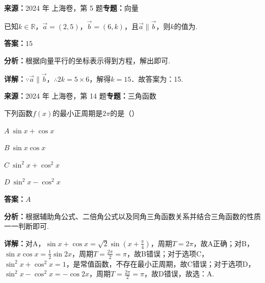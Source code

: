 \begin{question}[points=4]
\textbf{来源：}2024 年 上海卷，第 5 题\quad \textbf{专题：}向量\par
已知$k\in\mathbb{R}$，$\vec{a}=(2,5)$，$\vec{b}=(6,k)$，且$\vec{a}\parallel\vec{b}$，则$k$的值为.
\fillin[{$15$}]
\begin{solution}
\textbf{答案：}$15$

\textbf{分析：}根据向量平行的坐标表示得到方程，解出即可.

\textbf{详解：}$\because\vec{a}\parallel\vec{b}$，$\therefore 2k=5\times6$，解得$k=15$．故答案为：15.
\end{solution}
\end{question}

\begin{question}[points=4]
\textbf{来源：}2024 年 上海卷，第 14 题\quad \textbf{专题：}三角函数\par
下列函数$f(x)$的最小正周期是$2\pi$的是（\quad\quad）
\begin{choices}
  \item $A\ \sin x+\cos x$
  \item $B\ \sin x\cos x$
  \item $C\ \sin^2x+\cos^2x$
  \item $D\ \sin^2x-\cos^2x$
\end{choices}
\begin{solution}
\textbf{答案：}$A$

\textbf{分析：}根据辅助角公式、二倍角公式以及同角三角函数关系并结合三角函数的性质一一判断即可.

\textbf{详解：}对A，$\sin x+\cos x=\sqrt{2}\sin\left(x+\frac{\pi}{4}\right)$，周期$T=2\pi$，故A正确；对B，$\sin x\cos x=\frac{1}{2}\sin2x$，周期$T=\frac{2\pi}{2}=\pi$，故B错误；对于选项C，$\sin^2x+\cos^2x=1$，是常值函数，不存在最小正周期，故C错误；对于选项D，$\sin^2x-\cos^2x=-\cos2x$，周期$T=\frac{2\pi}{2}=\pi$，故D错误，故选：A.
\end{solution}
\end{question}

